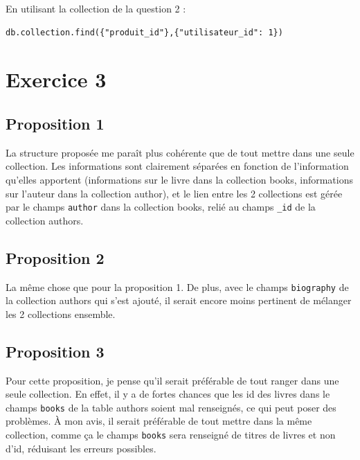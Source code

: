 \documentclass[12pt,a4paper]{article}
\begin{document}
	En utilisant la collection de la question 2 :
	
\begin{lstlisting}
db.collection.find({"produit_id"},{"utilisateur_id": 1})
\end{lstlisting}

\section*{Exercice 3}

\subsection*{Proposition 1}

La structure proposée me paraît plus cohérente que de tout mettre dans une seule collection. Les informations sont clairement séparées en fonction de l'information qu'elles apportent (informations sur le livre dans la collection books, informations sur l'auteur dans la collection author), et le lien entre les 2 collections est gérée par le champs \texttt{author} dans la collection books, relié au champs \texttt{\_id} de la collection authors.

\subsection*{Proposition 2}

La même chose que pour la proposition 1. De plus, avec le champs \texttt{biography} de la collection authors qui s'est ajouté, il serait encore moins pertinent de mélanger les 2 collections ensemble.

\subsection*{Proposition 3}

Pour cette proposition, je pense qu'il serait préférable de tout ranger dans une seule collection. En effet, il y a de fortes chances que les id des livres dans le champs \texttt{books} de la table authors soient mal renseignés, ce qui peut poser des problèmes. À mon avis, il serait préférable de tout mettre dans la même collection, comme ça le champs  \texttt{books} sera renseigné de titres de livres et non d'id, réduisant les erreurs possibles.
\end{document}
